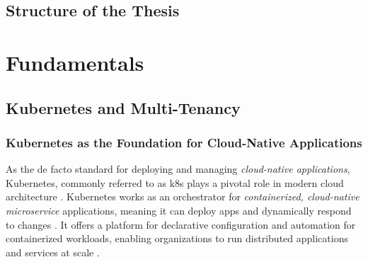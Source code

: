 \documentclass[11pt, a4paper, oneside, listof=totoc]{scrartcl}
\begin{document}
        \subsection{Structure of the Thesis}\label{subsec:structure}

    \section{Fundamentals}

        \subsection{Kubernetes and Multi-Tenancy}\label{subsec:k8sAndMultiTenancy}

            \subsubsection{Kubernetes as the Foundation for Cloud-Native Applications}\label{subsubsec:foundationK8s}
                As the de facto standard for deploying and managing 
                \textit{cloud-native applications}, Kubernetes, commonly referred to as \gls{k8s}
                plays a pivotal role in modern cloud architecture \parencite[p.~7--8]{poulton2021}.
                Kubernetes works as an  orchestrator for \textit{containerized,
                cloud-native microservice} applications, meaning it can deploy apps and dynamically
                respond to changes \parencite[p.~3]{poulton2021}.
                It offers a platform for declarative configuration and automation for containerized
                workloads, enabling organizations to run distributed applications and services at
                scale \parencite{kubernetesOverview,redhatWhatIsKubernetes}.
\end{document}

